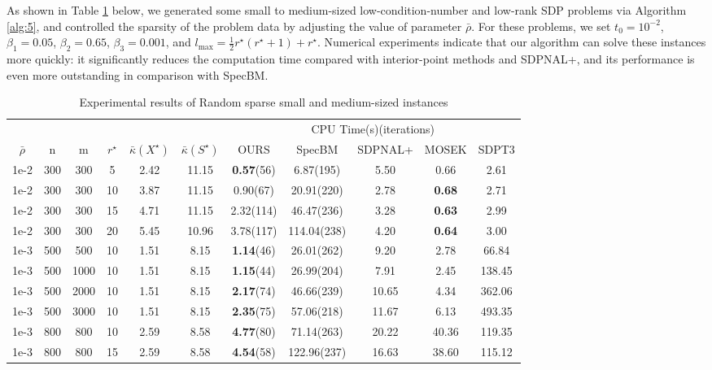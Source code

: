 \documentclass{jcmlatex}
\begin{document}
As shown in Table \ref{t4} below, we generated some small to medium-sized low-condition-number and low-rank SDP problems via Algorithm \ref{alg:5}, and controlled the sparsity of the problem data by adjusting the value of parameter \(\bar{\rho}\). For these problems, we set \(t_0 = 10^{-2}\), \(\beta_1 = 0.05\), \(\beta_2 = 0.65\), \(\beta_3 = 0.001\), and \(l_{\max}=\frac{1}{2}r^{\star}(r^{\star}+1)+r^{\star}\). Numerical experiments indicate that our algorithm can solve these instances more quickly: it significantly reduces the computation time compared with interior-point methods and SDPNAL+, and its performance is even more outstanding in comparison with SpecBM.
\begin{table}
    \centering
    \caption{Experimental results of Random sparse small and medium-sized instances}
    \label{t4}
    \setlength\tabcolsep{0.9pt}
    \begin{tabular*}{\textwidth}{@{\extracolsep\fill}ccccccccccc}
\toprule  
~&~&~&~&~&~& \multicolumn{5}{c}{CPU Time(s)(iterations)}  \\ 
\cmidrule{7-11}
\(\bar{\rho}\) & n &m& \(r^{\star}\) &\(\bar{\kappa}(X^{\star})\)&\(\bar{\kappa}(S^{\star})\)& OURS & SpecBM &SDPNAL+& MOSEK&SDPT3\\ 
\midrule    
    1e-2 & 300&300 &5 &2.42 &11.15 &\textbf{0.57}(56) &6.87(195)  &5.50 &0.66 &2.61 \\
    1e-2 & 300&300 &10&3.87 &11.15  &0.90(67) &20.91(220)  &2.78 &\textbf{0.68} &2.71 \\
    1e-2 & 300&300 &15&4.71 &11.15  &2.32(114) &46.47(236)  &3.28 &\textbf{0.63} &2.99 \\ 
    1e-2 & 300&300 &20&5.45 &10.96  &3.78(117) &114.04(238)  &4.20 &\textbf{0.64} &3.00 \\
\midrule    
    1e-3 & 500&500 &10&1.51 &8.15  &\textbf{1.14}(46) &26.01(262)  &9.20 &2.78&66.84\\
    1e-3 & 500&1000 &10&1.51 &8.15  &\textbf{1.15}(44) &26.99(204)  &7.91 &2.45&138.45\\
    1e-3 & 500&2000 &10&1.51 &8.15  &\textbf{2.17}(74) &46.66(239)  &10.65 &4.34&362.06\\ 
    1e-3 & 500&3000 &10&1.51 &8.15  &\textbf{2.35}(75) &57.06(218)  &11.67 &6.13&493.35\\ 
\midrule
    1e-3 & 800&800 &10&2.59 &8.58  &\textbf{4.77}(80) &71.14(263)  &20.22 &40.36 &119.35\\
    1e-3 & 800&800 &15&2.59 &8.58  &\textbf{4.54}(58) &122.96(237)  &16.63 &38.60 &115.12\\

\end{tabular*}
\end{table}
\end{document}
